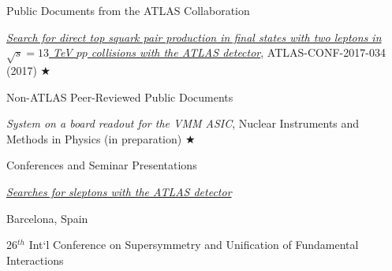 \begin{minipage}{0.8\textwidth}
\begin{minipage}{\textwidth}
\begin{minipage}{0.8\textwidth}
\vspace{0.25in}
\hspace{0.2in}Public Documents from the ATLAS Collaboration

\hspace{0.35in}
\begin{minipage}{1.0\textwidth}

\vspace{0.15in}
\href{https://atlas.web.cern.ch/Atlas/GROUPS/PHYSICS/CONFNOTES/ATLAS-CONF-2017-034/}{\textit{Search for direct top
squark pair production in final states with two leptons in $\sqrt{s} = 13$ TeV $pp$ collisions with the ATLAS detector}}, ATLAS-CONF-2017-034 (2017) $\bigstar$

\end{minipage}

\vspace{0.25in}
\hspace{0.2in}Non-ATLAS Peer-Reviewed Public Documents

\hspace{0.35in}
\begin{minipage}{1.0\textwidth}
\vspace{0.15in}
\textit{System on a board readout for the VMM ASIC}, Nuclear Instruments and Methods in Physics (in preparation) $\bigstar$

\end{minipage}


\end{minipage}

\newpage
{\Large Conferences and Seminar Presentations}\\
\HRule

\vspace{0.15in}

\hspace{0.25in}\begin{minipage}{0.8\textwidth}

\href{https://indico.cern.ch/event/689399/contributions/3005435/}{\textit{Searches for sleptons with the ATLAS detector}}

\vspace{0.05in}
\hspace{0.2in}
\begin{minipage}{1.0\textwidth}
Barcelona, Spain

26$^{th}$ Int`l Conference on Supersymmetry and Unification of Fundamental Interactions


\end{minipage}
\end{minipage}
\end{minipage}
\end{minipage}
